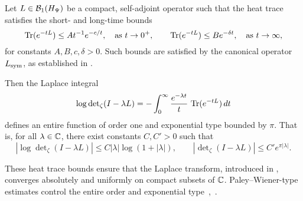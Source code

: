 \begin{lemma}
\label{lem:laplace_preserves_entire_type}
Let \( L \in \mathcal{B}_1(H_{\Psi}) \) be a compact, self-adjoint operator such that the heat trace satisfies the short- and long-time bounds
\[
\operatorname{Tr}(e^{-tL}) \le A t^{-1} e^{-c/t}, \quad \text{as } t \to 0^+,
\qquad
\operatorname{Tr}(e^{-tL}) \le B e^{-\delta t}, \quad \text{as } t \to \infty,
\]
for constants \( A, B, c, \delta > 0 \). Such bounds are satisfied by the canonical operator \( L_{\mathrm{sym}} \), as established in .

Then the Laplace integral
\[
\log \det\nolimits_\zeta(I - \lambda L)
= - \int_0^\infty \frac{e^{-\lambda t}}{t} \, \operatorname{Tr}(e^{-tL}) \, dt
\]
defines an entire function of order one and exponential type bounded by \( \pi \). That is, for all \( \lambda \in \mathbb{C} \), there exist constants \( C, C' > 0 \) such that
\[
\left| \log \det\nolimits_\zeta(I - \lambda L) \right| \le C |\lambda| \log(1 + |\lambda|),
\qquad
\left| \det\nolimits_\zeta(I - \lambda L) \right| \le C' e^{\pi |\lambda|}.
\]

\medskip
\noindent
These heat trace bounds ensure that the Laplace transform, introduced in , converges absolutely and uniformly on compact subsets of \( \mathbb{C} \). Paley–Wiener-type estimates control the entire order and exponential type~\cite[Ch.~3]{Simon2005TraceIdeals},~\cite[Ch.~9]{Levin1996EntireLectures}.
\end{lemma}
